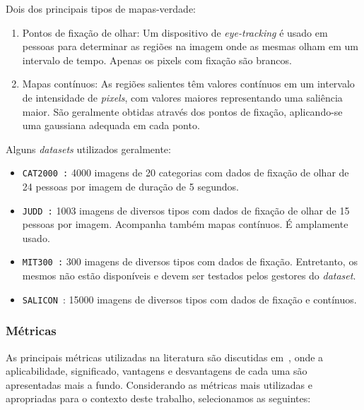 \documentclass[11pt]{article}
\newcommand{\tit}[1]{\textit{#1}}
\newcommand{\ttt}[1]{\texttt{#1}}
\begin{document}
Dois dos principais tipos de mapas-verdade:
\begin{enumerate}
	\item Pontos de fixação de olhar: Um dispositivo de
	\tit{eye-tracking} é usado em pessoas para determinar as regiões na imagem
	onde as mesmas olham em um intervalo de tempo. Apenas os pixels com
	fixação são brancos.

	\item Mapas contínuos: As regiões salientes têm valores
	contínuos em um intervalo de intensidade de \tit{pixels}, com valores
	maiores representando uma saliência maior.
	São geralmente obtidas através dos pontos de fixação, aplicando-se
	uma gaussiana adequada em cada ponto.
\end{enumerate}

Alguns \tit{datasets} utilizados geralmente:
\begin{itemize}
	\item \ttt{CAT2000~\cite{cat2000}:} 4000 imagens de 20 categorias com
		dados de fixação de olhar de 24 pessoas por imagem de duração de
		5 segundos.

	\item \ttt{JUDD~\cite{juddBM}:} 1003 imagens de diversos tipos com
		dados de fixação de olhar de 15 pessoas por imagem. Acompanha também
		mapas contínuos. É amplamente usado.

	\item \ttt{MIT300~\cite{mit-300}:} 300 imagens de diversos tipos
		com dados de fixação. Entretanto, os mesmos não estão disponíveis
		e devem ser testados pelos gestores do \tit{dataset}.

    \item \ttt{SALICON}~\cite{jiang_2015}: 15000 imagens de diversos tipos
        com dados de fixação e contínuos.
\end{itemize}

\subsubsection{Métricas}

As principais métricas utilizadas na literatura são discutidas em~\cite{judd2},
onde a aplicabilidade, significado, vantagens e desvantagens
de cada uma são apresentadas mais a fundo. Considerando as métricas mais utilizadas e apropriadas para o contexto deste trabalho, selecionamos as seguintes:
\end{document}
